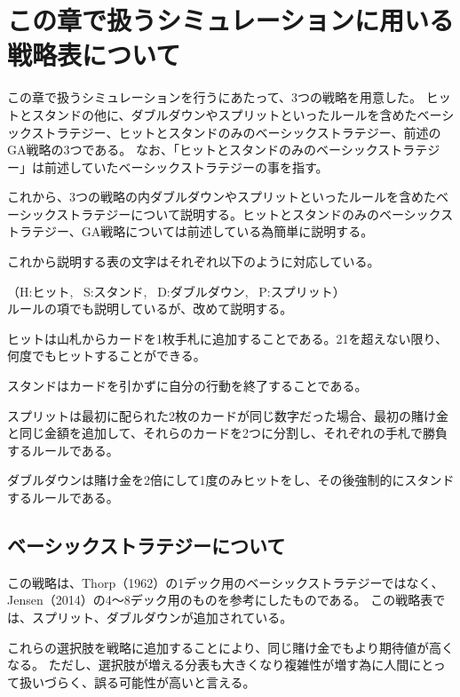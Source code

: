 \section{この章で扱うシミュレーションに用いる戦略表について}
この章で扱うシミュレーションを行うにあたって、3つの戦略を用意した。
ヒットとスタンドの他に、ダブルダウンやスプリットといったルールを含めたベーシックストラテジー、ヒットとスタンドのみのベーシックストラテジー、前述のGA戦略の3つである。
なお、「ヒットとスタンドのみのベーシックストラテジー」は前述していたベーシックストラテジーの事を指す。

これから、3つの戦略の内ダブルダウンやスプリットといったルールを含めたベーシックストラテジーについて説明する。ヒットとスタンドのみのベーシックストラテジー、GA戦略については前述している為簡単に説明する。

これから説明する表の文字はそれぞれ以下のように対応している。

（H:ヒット, \ S:スタンド, \ D:ダブルダウン, \ P:スプリット）  
\\

ルールの項でも説明しているが、改めて説明する。

ヒットは山札からカードを1枚手札に追加することである。21を超えない限り、何度でもヒットすることができる。

スタンドはカードを引かずに自分の行動を終了することである。

スプリットは最初に配られた2枚のカードが同じ数字だった場合、最初の賭け金と同じ金額を追加して、それらのカードを2つに分割し、それぞれの手札で勝負するルールである。

ダブルダウンは賭け金を2倍にして1度のみヒットをし、その後強制的にスタンドするルールである。



\subsection{ベーシックストラテジーについて}

この戦略は、Thorp（1962）の1デック用のベーシックストラテジーではなく、Jensen（2014）の4～8デック用のものを参考にしたものである。
この戦略表では、スプリット、ダブルダウンが追加されている。

これらの選択肢を戦略に追加することにより、同じ賭け金でもより期待値が高くなる。
ただし、選択肢が増える分表も大きくなり複雑性が増す為に人間にとって扱いづらく、誤る可能性が高いと言える。

